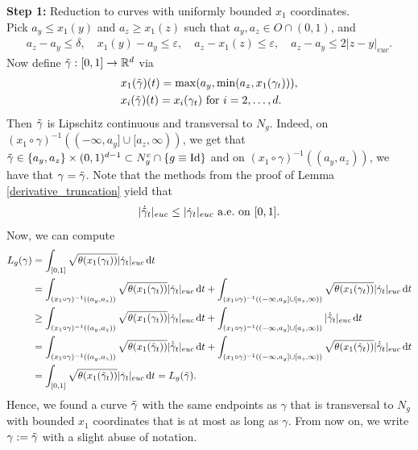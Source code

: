 \documentclass[a4paper,10pt]{article}
\numberwithin{equation}{section}
\newcommand{\R}{\mathbb{R}}
\newcommand{\e}{\varepsilon}
\newcommand{\di}{{\rm d}}
\begin{document}
\textbf{Step 1:} Reduction to curves with uniformly bounded $x_1$ coordinates.\\
Pick $a_y \leq x_1(y)$ and $a_{z} \geq x_1(z)$ such that $a_y, a_{z} \in O\cap (0,1)$, and
\begin{align}\label{truncation_interval}
    a_{z}-a_y \leq \delta, \quad x_1(y)-a_y \leq \e,\quad  a_{z}-x_1(z) \leq \e,\quad  a_{z}-a_y \leq 2|z-y|_{euc}. 
\end{align}
Now define $\Tilde{\gamma}:[0,1] \to \R^d$ via 
\begin{align}
    &x_1(\Tilde{\gamma})(t) = \max(a_y, \min( a_{z}, x_1(\gamma_t))), \nonumber \\
    &x_i(\Tilde{\gamma})(t) = x_i({\gamma}_t)\ \mathrm{for} \ i=2, \ldots, d.
\end{align}
Then $\Tilde{\gamma}$ is Lipschitz continuous and transversal to $N_g$. Indeed, on $(x_1 \circ \gamma)^{-1}((-\infty, a_y] \cup [a_{z}, \infty))$, we get that $\Tilde{\gamma} \in \{a_y, a_{z}\} \times (0,1)^{d-1} \subset N^c_g \cap \{g \equiv \mathrm{Id}\}$ and on $(x_1 \circ \gamma)^{-1}((a_y, a_{z}))$, we have that $\gamma = \Tilde{\gamma}$. Note that the methods from the proof of Lemma \ref{derivative_truncation} yield that
\begin{align}
 |\dot{\Tilde{\gamma}}_t|_{euc} \leq |\dot{\gamma}_t|_{euc} \ \mathrm{a.e.\ on} \ [0,1].
\end{align}
Now, we can compute 
\begin{align}\label{estimate_length_gamma_1}
    L_g(\gamma) &= \int_{[0,1]} \sqrt{\theta(x_1(\gamma_t))} |\dot{\gamma}_t|_{euc} \, \di t \nonumber \\
    &= \int_{(x_1 \circ \gamma)^{-1}((a_y, a_{z}))} \sqrt{\theta(x_1(\gamma_t))} |\dot{\gamma}_t|_{euc} \, \di t+ \int_{(x_1 \circ \gamma)^{-1}((-\infty, a_y]\cup [ a_{z}, \infty))} \sqrt{\theta(x_1(\gamma_t))} |\dot{\gamma}_t|_{euc} \, \di t \nonumber \\
    & \geq \int_{(x_1 \circ \gamma)^{-1}((a_y, a_{z}))} \sqrt{\theta(x_1(\gamma_t))} |\dot{\gamma}_t|_{euc} \, \di t+ \int_{(x_1 \circ \gamma)^{-1}((-\infty, a_y]\cup [ a_{z}, \infty))} |\dot{\Tilde{\gamma}}_t|_{euc} \, \di t\nonumber \\
    & = \int_{(x_1 \circ \gamma)^{-1}((a_y, a_{z}))} \sqrt{\theta(x_1(\Tilde{\gamma}_t))} |\dot{\Tilde{\gamma}}_t|_{euc} \, \di t+ \int_{(x_1 \circ \gamma)^{-1}((-\infty, a_y]\cup [ a_{z}, \infty))} \sqrt{\theta(x_1(\Tilde{\gamma}_t))} |\dot{\Tilde{\gamma}}_t|_{euc} \, \di t \nonumber\\
    &= \int_{[0,1]} \sqrt{\theta(x_1(\Tilde{\gamma}_t))} |\dot{\gamma}_t|_{euc} \, \di t=L_g(\Tilde{\gamma}).
\end{align}
Hence, we found a curve $\Tilde{\gamma}$ with the same endpoints as $\gamma$ that is transversal to $N_g$ with bounded $x_1$ coordinates that is at most as long as $\gamma$. From now on, we write $\gamma:= \Tilde{\gamma}$ with a slight abuse of notation. 
\end{document}
